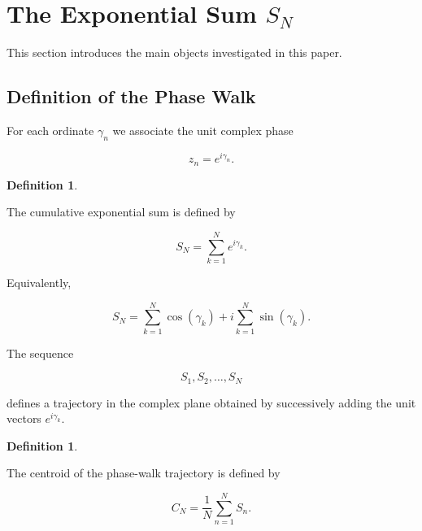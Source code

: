 \documentclass[11pt]{amsart}
\numberwithin{equation}{section}
\theoremstyle{plain}
\theoremstyle{definition}
\newtheorem{definition}[theorem]{Definition}
\theoremstyle{remark}
\begin{document}
\section[The Exponential Sum SN]{The Exponential Sum \texorpdfstring{\(S_N\)}{SN}}
\label{sec:SN_definition}

This section introduces the main objects investigated in this paper.

\subsection{Definition of the Phase Walk}
\label{subsec:phase_walk}

For each ordinate
\(\gamma_n\)
we associate the unit complex phase

\begin{equation}
z_n
=
e^{i\gamma_n}.
\label{eq:phase_definition}
\end{equation}

\begin{definition}
\label{def:SN}

The cumulative exponential sum is defined by

\begin{equation}
S_N
=
\sum_{k=1}^{N}
e^{i\gamma_k}.
\label{eq:SN_definition}
\end{equation}

\end{definition}

Equivalently,

\begin{equation}
S_N
=
\sum_{k=1}^{N}
\cos(\gamma_k)
+
i
\sum_{k=1}^{N}
\sin(\gamma_k).
\label{eq:SN_real_imag}
\end{equation}

The sequence

\begin{equation}
S_1,S_2,\ldots,S_N
\label{eq:SN_trajectory}
\end{equation}

defines a trajectory in the complex plane obtained by successively
adding the unit vectors
\(e^{i\gamma_k}\).

\begin{definition}
\label{def:CN}

The centroid of the phase-walk trajectory is defined by

\begin{equation}
C_N
=
\frac{1}{N}
\sum_{n=1}^{N}
S_n.
\label{eq:CN_definition}
\end{equation}

\end{definition}
\end{document}
